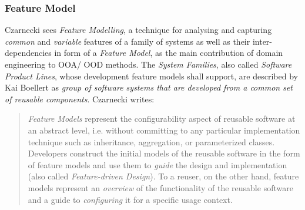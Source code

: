 %
%
%
%
%
%
%

\subsubsection{Feature Model}
\label{feature_model_heading}

Czarnecki \cite{czarnecki} sees \emph{Feature Modelling}, a technique for
analysing and capturing \emph{common} and \emph{variable} features of a family
of systems as well as their inter-dependencies in form of a \emph{Feature Model},
as the main contribution of domain engineering to OOA/ OOD methods. The
\emph{System Families}, also called \emph{Software Product Lines}, whose
development feature models shall support, are described by Kai Boellert
\cite{boellert} as \textit{group of software systems that are developed from a
common set of reusable components}. Czarnecki writes:

\begin{quote}
    \emph{Feature Models} represent the configurability aspect of reusable
    software at an abstract level, i.e. without committing to any particular
    implementation technique such as inheritance, aggregation, or parameterized
    classes. Developers construct the initial models of the reusable software
    in the form of feature models and use them to \emph{guide} the design and
    implementation (also called \emph{Feature-driven Design}). To a reuser, on
    the other hand, feature models represent an \emph{overview} of the
    functionality of the reusable software and a guide to \emph{configuring} it
    for a specific usage context.
\end{quote}

